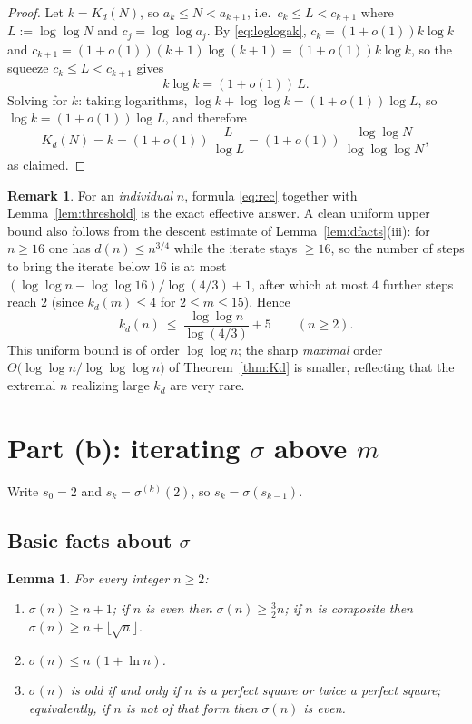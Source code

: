 \documentclass{amsart}
\newtheorem{lemma}{Lemma}
\theoremstyle{definition}
\newtheorem{remark}{Remark}
\begin{document}
\begin{proof}
Let $k=K_d(N)$, so $a_k\le N<a_{k+1}$, i.e.\ $c_k\le L<c_{k+1}$ where
$L:=\log\log N$ and $c_j=\log\log a_j$. By \eqref{eq:loglogak},
$c_k=(1+o(1))k\log k$ and $c_{k+1}=(1+o(1))(k+1)\log(k+1)=(1+o(1))k\log k$, so
the squeeze $c_k\le L<c_{k+1}$ gives
\[
k\log k=(1+o(1))\,L .
\]
Solving for $k$: taking logarithms, $\log k+\log\log k=(1+o(1))\log L$, so
$\log k=(1+o(1))\log L$, and therefore
\[
K_d(N)=k=(1+o(1))\,\frac{L}{\log L}
      =(1+o(1))\,\frac{\log\log N}{\log\log\log N},
\]
as claimed.
\end{proof}

\begin{remark}
For an \emph{individual} $n$, formula \eqref{eq:rec} together with
Lemma~\ref{lem:threshold} is the exact effective answer. A clean uniform upper
bound also follows from the descent estimate of Lemma~\ref{lem:dfacts}(iii):
for $n\ge16$ one has $d(n)\le n^{3/4}$ while the iterate stays $\ge16$, so the
number of steps to bring the iterate below $16$ is at most
$(\log\log n-\log\log16)/\log(4/3)+1$, after which at most $4$ further steps
reach $2$ (since $k_d(m)\le4$ for $2\le m\le15$). Hence
\[
k_d(n)\ \le\ \frac{\log\log n}{\log(4/3)}+5\qquad(n\ge2).
\]
This uniform bound is of order $\log\log n$; the sharp \emph{maximal} order
$\Theta\!\bigl(\log\log n/\log\log\log n\bigr)$ of Theorem~\ref{thm:Kd} is
smaller, reflecting that the extremal $n$ realizing large $k_d$ are very rare.
\end{remark}

\section{Part (b): iterating $\sigma$ above $m$}

Write $s_0=2$ and $s_k=\sigma^{(k)}(2)$, so $s_k=\sigma(s_{k-1})$.

\subsection{Basic facts about $\sigma$}

\begin{lemma}\label{lem:sfacts}
For every integer $n\ge 2$:
\begin{enumerate}
\item[(i)] $\sigma(n)\ge n+1$; if $n$ is even then $\sigma(n)\ge \tfrac32 n$;
if $n$ is composite then $\sigma(n)\ge n+\lfloor\sqrt n\rfloor$.
\item[(ii)] $\sigma(n)\le n\,(1+\ln n)$.
\item[(iii)] $\sigma(n)$ is odd if and only if $n$ is a perfect square or
twice a perfect square; equivalently, if $n$ is \emph{not} of that form then
$\sigma(n)$ is even.
\end{enumerate}
\end{lemma}
\end{document}
